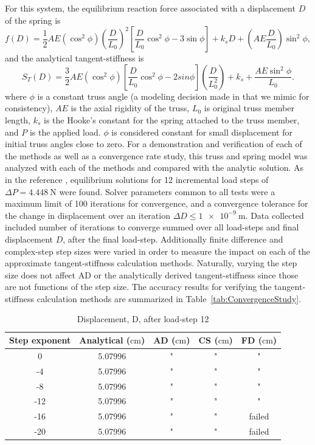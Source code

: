 \documentclass[preprint,12pt]{elsarticle}
\begin{document}
%
For this system, the equilibrium reaction force associated with a displacement $D$ of the spring is 
%
\begin{equation} 
    \label{eqn:TrussForce}
    f(D) = \frac 1 2 AE(\cos^{2}\phi)\left(\frac{D}{L_{0}}\right)^{2}\left[\frac{D}{L_{0}}\cos^{2}\phi - 3\sin\phi\right] + k_{s}D + \left(AE\frac{D}{L_{0}}\right)\sin^{2}\phi,
\end{equation} 
%
and the analytical tangent-stiffness is 
%
\begin{equation} 
    \label{eqn:TrussStiffness}
    S_{T}(D) = \frac 3 2 AE(\cos^{2}\phi)\left[\frac{D}{L_{0}}\cos^{2}\phi - 2sin\phi\right]\left(\frac{D}{L_{0}^{2}}\right) + k_{s} + \frac{AE\sin^{2}\phi}{L_{0}}.
\end{equation}
%
where $\phi$ is a constant truss angle (a modeling decision made in \cite{rezaiee2010dynamic} that we mimic for consistency), $AE$ is the axial rigidity of the truss, $L_{0}$ is original truss member length, $k_{s}$ is the Hooke's constant for the spring attached to the truss member, and $P$ is the applied load. $\phi$ is considered constant for small displacement for initial truss angles close to zero. For a demonstration and verification of each of the methods as well as a convergence rate study, this truss and spring model was analyzed with each of the methods and compared with the analytic solution. As in the reference \cite{rezaiee2010dynamic}, equilibrium solutions for 12 incremental load steps of $\Delta P=\SI{4.448}{\newton}$ were found. Solver parameters common to all tests were a maximum limit of 100 iterations for convergence, and a convergence tolerance for the change in displacement over an iteration $\Delta D \le \SI{1e-9}{\meter}$.  Data collected included number of iterations to converge summed over all load-steps and final displacement $D$, after the final load-step. Additionally finite difference and complex-step step sizes were varied in order to measure the impact on each of the approximate tangent-stiffness calculation methods. Naturally, varying the step size does not affect AD or the analytically derived tangent-stiffness since those are not functions of the step size. The accuracy results for verifying the tangent-stiffness calculation methods are summarized in Table~\ref{tab:ConvergenceStudy}. 
%
\begin{table}[tbp]    
  \centering
  \caption{Displacement, D, after load-step 12} \label{tab:Verification}   
        \begin{tabular}{c c c c c}
         \toprule
         Step exponent & Analytical ($\si{\centi\meter}$) & AD ($\si{\centi\meter}$) & CS ($\si{\centi\meter}$) & FD ($\si{\centi\meter}$)\\ 
        \midrule
        0 & 5.07996 & " & " & "\\
        -4 & 5.07996 & " & " & "\\
        -8 & 5.07996 & " & " & "\\
        -12 & 5.07996 & " & " & " \\
        -16 & 5.07996 & " & " & failed \\
        -20 & 5.07996 & " & " & failed \\
        \bottomrule
    \end{tabular}
\end{table}
\end{document}
